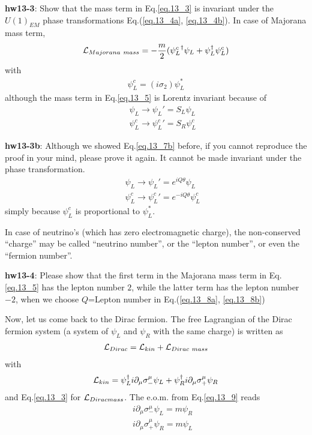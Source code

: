 \documentclass[12pt]{article}
\def\del{{\partial}}
\begin{document}
{\bf hw13-3}: Show that the mass term in Eq.\ref{eq.13_3} is invariant under the $U(1)_{EM}$
  phase transformations Eq.(\ref{eq.13_4a}, \ref{eq.13_4b}).
  In case of Majorana mass term,
\begin{eqnarray}
  {\cal L}_{Majorana~mass}
  = -\frac{m}{2} ({\psi_L^c}^\dagger \psi_L + \psi_L^\dagger \psi_L^c) \label{eq.13_5}
\end{eqnarray}
  with
\begin{eqnarray}
  \psi_L^c = (i\sigma_2) \psi_L^* \label{eq.13_6}
\end{eqnarray}
  although the mass term in Eq.\ref{eq.13_5} is Lorentz invariant because of
\begin{eqnarray}
  &&\psi_L   \to \psi_L'   = S_L \psi_L  \label{eq.13_7a} \\
  && \psi_L^c \to {\psi_L^c}' = S_R \psi_L^c \label{eq.13_7b}
\end{eqnarray}
 
{\bf hw13-3b}: Although we showed Eq.\ref{eq.13_7b} before, if you cannot reproduce the proof
  in your mind, please prove it again.
  It cannot be made invariant under the phase transformation.
\begin{eqnarray}
  && \psi_L   \to \psi_L'   = e^{ iQ\theta} \psi_L  \label{eq.13_8a} \\
  && \psi_L^c \to {\psi_L^c}' = e^{-iQ\theta} \psi_L^c \label{eq.13_8b}
\end{eqnarray}
  simply because $\psi_L^c$ is proportional to $\psi_L^*$.

  In case of neutrino's (which has zero electromagnetic charge), the
  non-conserved ``charge'' may be called ``neutrino number'', or the
  ``lepton number'', or even the ``fermion number''.

{\bf hw13-4}: Please show that the first term in the Majorana mass term in Eq.\ref{eq.13_5}
  has the lepton number $2$, while the latter term has the lepton number
  $-2$, when we choose $Q$=Lepton number in Eq.(\ref{eq.13_8a}, \ref{eq.13_8b})

  Now, let us come back to the Dirac fermion.  The free Lagrangian of
  the Dirac fermion system (a system of $\psi_L$ and $\psi_R$ with the
  same charge) is written as
\begin{eqnarray}
  {\cal L}_{Dirac} = {\cal L}_{kin} + {\cal L}_{Dirac~mass} \label{eq.13_9}
\end{eqnarray}
  with
\begin{eqnarray}
  {\cal L}_{kin}
  = \psi_L^\dagger i\del_\mu \sigma_-^\mu \psi_L
  + \psi_R^\dagger i\del_\mu \sigma_+^\mu \psi_R  \label{eq.13_10}
\end{eqnarray}
  and Eq.\ref{eq.13_3} for ${\cal L}_{Dirac mass}$.  The e.o.m. from Eq.\ref{eq.13_9} reads
\begin{eqnarray}
  &&i\del_\mu \sigma_-^\mu \psi_L = m \psi_R   \label{eq.13_11a} \\
  && i\del_\mu \sigma_+^\mu \psi_R = m \psi_L \label{eq.13_11b}
\end{eqnarray}
  
\end{document}
